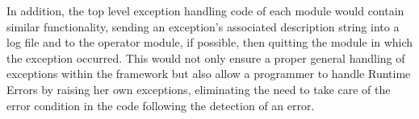 \documentclass[12pt,a4paper]{article}
\begin{document}
In addition, the top level exception handling code
of each module would contain similar functionality,
sending an exception's associated description string into
a log file and to the operator module, if possible, then
quitting the module in which the exception occurred.
This would not only ensure
a proper general handling of exceptions within the framework but
also allow a programmer to handle {Runtime Errors} by raising
her own exceptions, eliminating the need to take care of the error
condition in the code following the detection of an error.

%
%
%
%
%
%
%
%
%
\end{document}
